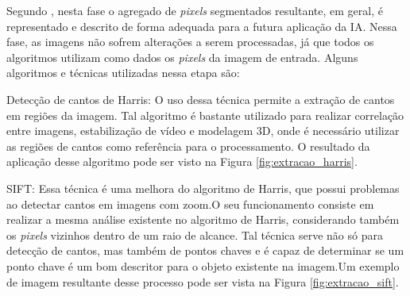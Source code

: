 \documentclass[12pt,oneside,a4paper,chapter=TITLE,section=TITLE,sumario
		=tradicional]{abntex2}
\begin{document}
		Segundo , nesta fase o agregado de \textit{pixels} segmentados resultante, em geral, é representado e descrito de forma adequada para a futura aplicação da IA. Nessa fase, as imagens não sofrem alterações a serem processadas, já que todos os algoritmos utilizam como dados os \textit{pixels} da imagem de entrada. Alguns algoritmos e técnicas utilizadas nessa etapa são:
		
		\begin{lista}
			\item Detecção de cantos de Harris: O uso dessa técnica permite a extração de cantos em regiões da imagem. Tal algoritmo é bastante utilizado para realizar correlação entre imagens, estabilização de vídeo e modelagem 3D, onde é necessário utilizar as regiões de cantos como referência para o processamento. O resultado da aplicação desse algoritmo pode ser visto na Figura \ref{fig:extracao_harris}.
			
			\begin{figure}[h]
			\end{figure}
			
			\item SIFT: Essa técnica é uma melhora do algoritmo de Harris, que possui problemas ao detectar cantos em imagens com zoom.\hspace{0.1cm}O seu funcionamento consiste em realizar a mesma análise existente no algoritmo de Harris, considerando também os \textit{pixels} vizinhos dentro de um raio de alcance. Tal técnica serve não só para detecção de cantos, mas também de pontos chaves e é capaz de determinar se um ponto chave é um bom descritor para o objeto existente na imagem.\hspace{0.1cm}Um exemplo de imagem resultante desse processo pode ser vista na Figura \ref{fig:extracao_sift}.
			
			\begin{figure}[h]
				 \\
			\end{figure}
			

\end{lista}
\end{document}
